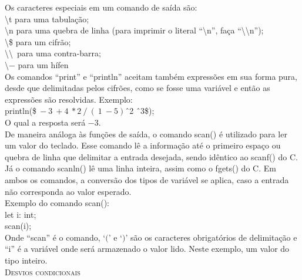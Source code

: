 \documentclass[12pt,a4paper]{article}
\begin{document}
Os caracteres especiais em um comando de saída são:\\[0.2cm]
\textbackslash t para uma tabulação; \\
\textbackslash n para uma quebra de linha (para imprimir o literal ``\textbackslash n'', faça ``\textbackslash \textbackslash n'');\\
\textbackslash \$ para um cifrão; \\
\textbackslash \textbackslash\ para uma contra-barra; \\
\textbackslash $-$ para um hífen\\

Os comandos ``print'' e ``println'' aceitam também expressões em sua forma pura, desde que delimitadas pelos cifrões, como se fosse uma variável e então as expressões são resolvidas. Exemplo: \\

println(\$$\ -3\ +4\ *2\ /\ (\ 1\ - 5)$\^\ 2 \^\ 3\$);\\

O qual a resposta será $-3$.\\

De maneira análoga às funções de saída, o comando scan() é utilizado para ler um valor do teclado. Esse comando lê a informação até o primeiro espaço ou quebra de linha que delimitar a entrada desejada, sendo idêntico ao scanf() do C. Já o comando scanln() lê uma linha inteira, assim como o fgets() do C. Em ambos os comandos, a conversão dos tipos de variável se aplica, caso a entrada não corresponda ao valor esperado.\\

Exemplo do comando scan(): \\

let i: int;\\

scan(i);\\

Onde ``scan'' é o comando, `$($' e `$)$' são os caracteres obrigatórios de delimitação e ``i'' é a variável onde será armazenado o valor lido. Neste exemplo, um valor do tipo inteiro.\\


\hypertarget{label4}{\Large{\textsc{Desvios condicionais}}}\\[0.3cm]
\normalsize
\end{document}
